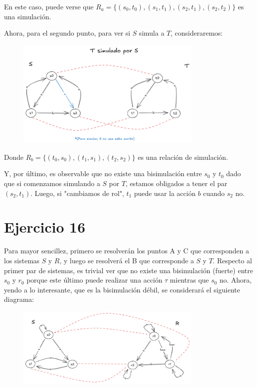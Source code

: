 \documentclass{article}
\begin{document}
En este caso, puede verse que $R_a = \{(s_0, t_0), (s_1, t_1), (s_2, t_1), (s_2, t_2)\}$ es una simulación.

Ahora, para el segundo punto, para ver si $S$ simula a $T$, consideraremos:
\begin{figure}[!htb]
	\includegraphics[width=0.8\textwidth]{02-15-b.png}
	\centering
\end{figure}

Donde $R_b = \{(t_0, s_0), (t_1, s_1), (t_2, s_2)\}$ es una relación de simulación.

Y, por último, es observable que no existe una bisimulación entre $s_0$ y $t_0$ dado que si comenzamos simulando a $S$ por $T$, estamos obligados a tener el par $(s_2, t_1)$.
Luego, si "cambiamos de rol", $t_1$ puede usar la acción $b$ cuando $s_2$ no.

\pagebreak
\section*{Ejercicio 16}
Para mayor sencillez, primero se resolverán los puntos A y C que corresponden a los sistemas $S$ y $R$, y luego se resolverá el B que corresponde a $S$ y $T$.
Respecto al primer par de sistemas, es trivial ver que no existe una bisimulación (fuerte) entre $s_0$ y $r_0$ porque este último puede realizar una acción $\tau$ mientras que $s_0$ no.
Ahora, yendo a lo interesante, que es la bisimulación débil, se considerará el siguiente diagrama:
\begin{figure}[!htb]
	\includegraphics[width=0.8\textwidth]{02-16-c.png}
	\centering
\end{figure}
\end{document}
